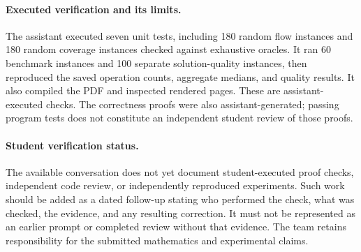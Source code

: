\paragraph{Executed verification and its limits.}
The assistant executed seven unit tests, including 180 random flow instances
and 180 random coverage instances checked against exhaustive oracles. It
ran 60 benchmark instances and 100 separate solution-quality instances, then
reproduced the saved operation counts, aggregate medians, and quality results.
It also compiled the PDF and inspected rendered pages. These are
assistant-executed checks. The correctness proofs were also assistant-generated;
passing program tests does not constitute an independent student review of
those proofs.

\paragraph{Student verification status.}
The available conversation does not yet document student-executed proof
checks, independent code review, or independently reproduced experiments.
Such work should be added as a dated follow-up stating who performed the
check, what was checked, the evidence, and any resulting correction. It must
not be represented as an earlier prompt or completed review without that
evidence. The team retains responsibility for the submitted mathematics and
experimental claims.
